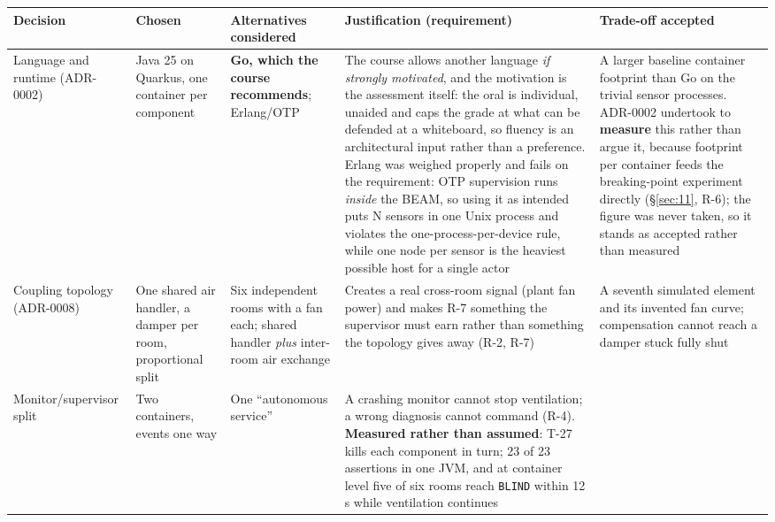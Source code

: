 \begin{longtable}[]{@{}
  >{\raggedright\arraybackslash}p{}
  >{\raggedright\arraybackslash}p{}
  >{\raggedright\arraybackslash}p{}
  >{\raggedright\arraybackslash}p{}
  >{\raggedright\arraybackslash}p{}@{}}
\toprule
\textbf{Decision} & \textbf{Chosen} & \textbf{Alternatives considered} & \textbf{Justification
(requirement)} & \textbf{Trade-off accepted} \\
\midrule
\endhead
Language and runtime (ADR-0002) & Java 25 on Quarkus, one container per component & \textbf{Go,
which the course recommends}; Erlang/OTP & The course allows another language \emph{if strongly
motivated}, and the motivation is the assessment itself: the oral is individual, unaided and
caps the grade at what can be defended at a whiteboard, so fluency is an architectural input
rather than a preference. Erlang was weighed properly and fails on the requirement: OTP
supervision runs \emph{inside} the BEAM, so using it as intended puts N sensors in one Unix
process and violates the one-process-per-device rule, while one node per sensor is the heaviest
possible host for a single actor & A larger baseline container footprint than Go on the trivial
sensor processes. ADR-0002 undertook to \textbf{measure} this rather than argue it, because
footprint per container feeds the breaking-point experiment directly (§\ref{sec:11}, R-6); the figure was
never taken, so it stands as accepted rather than measured \\
Coupling topology (ADR-0008) & One shared air handler, a damper per room, proportional split &
Six independent rooms with a fan each; shared handler \emph{plus} inter-room air exchange &
Creates a real cross-room signal (plant fan power) and makes R-7 something the supervisor must
earn rather than something the topology gives away (R-2, R-7) & A seventh simulated element and
its invented fan curve; compensation cannot reach a damper stuck fully shut \\
Monitor/supervisor split & Two containers, events one way & One ``autonomous service'' &
A crashing monitor cannot stop ventilation; a wrong diagnosis cannot command (R-4). \textbf{Measured
rather than assumed}: T-27 kills each component in turn; 23 of 23 assertions in one JVM, and at
container level five of six rooms reach \texttt{BLIND} within 12 s while ventilation continues

\end{longtable}
